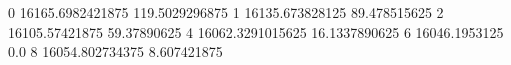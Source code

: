 0 16165.6982421875 119.5029296875
1 16135.673828125 89.478515625
2 16105.57421875 59.37890625
4 16062.3291015625 16.1337890625
6 16046.1953125 0.0
8 16054.802734375 8.607421875

